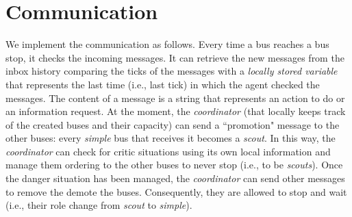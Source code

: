 \documentclass[a4paper]{article}
\begin{document}
\section{Communication}

We implement the communication as follows. Every time a bus reaches a bus stop, it checks the incoming messages. It can retrieve the new messages from the inbox history comparing the ticks of the messages with a \textit{locally stored variable} that represents the last time (i.e., last tick) in which the agent checked the messages. The content of a message is a string that represents an action to do or an information request. At the moment, the \textit{coordinator} (that locally keeps track of the created buses and their capacity) can send a ``promotion" message to the other buses: every \textit{simple} bus that receives it becomes a \textit{scout}. In this way, the \textit{coordinator} can check for critic situations using its own local information and manage them ordering to the other buses to never stop (i.e., to be \textit{scouts}). Once the danger situation has been managed, the \textit{coordinator} can send other messages to remove the demote the buses. Consequently, they are allowed to stop and wait (i.e., their role change from \textit{scout} to \textit{simple}).
\end{document}
